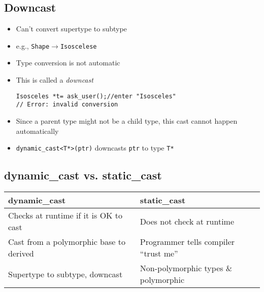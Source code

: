 \subsection{Downcast}
\begin{itemize}
	\item Can't convert supertype to subtype
	\item e.g., \lstinline[style=C++]{Shape}$\to$\lstinline[style=C++]{Isoscelese}
	\item Type conversion is not automatic
	\item This is called a \textit{downcast}
\begin{lstlisting}[style=C++]
Isosceles *t= ask_user();//enter "Isosceles"
// Error: invalid conversion
\end{lstlisting}
	\item Since a parent type might not be a child type, this cast cannot happen automatically
	\item \lstinline[style=C++]{dynamic_cast<T*>(ptr)} downcasts \lstinline[style=C++]{ptr} to type \lstinline[style=C++]{T*}
\end{itemize}

\subsection{dynamic\_cast vs. static\_cast}
\begin{center}
\begin{tabular}{l|l}
	dynamic\_cast & static\_cast \\
	\hline
	Checks at runtime if it is OK to cast & Does not check at runtime \\
	Cast from a polymorphic base to derived & Programmer tells compiler ``trust me'' \\
	Supertype to subtype, downcast & Non-polymorphic types \& polymorphic \\
\end{tabular}
\end{center}